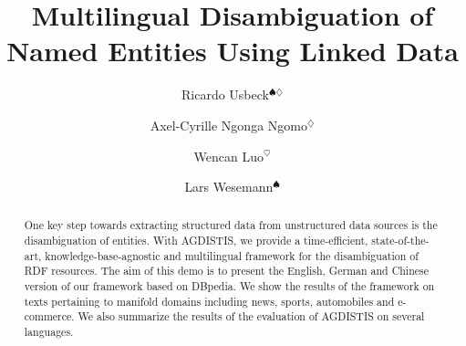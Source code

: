 \documentclass{llncs}
\begin{document}
\title{Multilingual Disambiguation of Named Entities Using Linked Data}


\author{
Ricardo Usbeck$^{\spadesuit\diamondsuit}$ \and 
Axel-Cyrille Ngonga Ngomo$^{\diamondsuit}$ \and
Wencan Luo$^{\heartsuit}$  \and 
Lars Wesemann$^{\spadesuit}$ 
}

\maketitle


\begin{abstract}
One key step towards extracting structured data from unstructured data sources is the disambiguation of entities.
With AGDISTIS, we provide a time-efficient, state-of-the-art, knowledge-base-agnostic and multilingual framework for the disambiguation of RDF resources.
The aim of this demo is to present the English, German and Chinese version of our framework based on DBpedia.
We show the results of the framework on texts pertaining to manifold domains including news, sports, automobiles and e-commerce.
We also summarize the results of the evaluation of AGDISTIS on several languages.
\end{abstract} 
\end{document}
